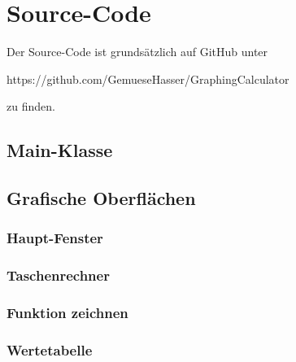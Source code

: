 \documentclass[12pt,a4paper]{article}
\newcommand{\project}{/home/jonas/Dokumente/Java-Projekte/GraphingCalculator/src/main/java/de/jonas/graphingcalculator}
\begin{document}
    \newpage


    \section{Source-Code}
    Der Source-Code ist grundsätzlich auf GitHub unter\par
    https://github.com/GemueseHasser/GraphingCalculator\par
    zu finden.

    \vspace{1cm}

    \subsection{Main-Klasse}

    

    \newpage

    \subsection{Grafische Oberflächen}

    \subsubsection{Haupt-Fenster}
    

    \newpage

    \subsubsection{Taschenrechner}
    

    \newpage

    \subsubsection{Funktion zeichnen}
    

    \newpage

    \subsubsection{Wertetabelle}
    
\end{document}
